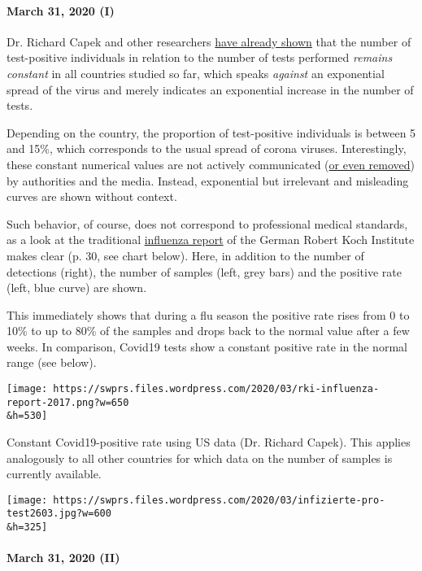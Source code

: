 \hypertarget{march-31-2020-i}{%
\paragraph{March 31, 2020 (I)}\label{march-31-2020-i}}

Dr. Richard Capek and other researchers
\href{https://coronadaten.wordpress.com/}{have already shown} that the
number of test-positive individuals in relation to the number of tests
performed \emph{remains constant} in all countries studied so far, which
speaks \emph{against} an exponential spread of the virus and merely
indicates an exponential increase in the number of tests.

Depending on the country, the proportion of test-positive individuals is
between 5 and 15\%, which corresponds to the usual spread of corona
viruses. Interestingly, these constant numerical values are not actively
communicated
(\href{https://multipolar-magazin.de/artikel/coronavirus-irrefuhrung-fallzahlen}{or
even removed}) by authorities and the media. Instead, exponential but
irrelevant and misleading curves are shown without context.

Such behavior, of course, does not correspond to professional medical
standards, as a look at the traditional
\href{https://influenza.rki.de/Saisonberichte/2017.pdf}{influenza
report} of the German Robert Koch Institute makes clear (p. 30, see
chart below). Here, in addition to the number of detections (right), the
number of samples (left, grey bars) and the positive rate (left, blue
curve) are shown.

This immediately shows that during a flu season the positive rate rises
from 0 to 10\% to up to 80\% of the samples and drops back to the normal
value after a few weeks. In comparison, Covid19 tests show a constant
positive rate in the normal range (see below).

\texttt{[image: https://swprs.files.wordpress.com/2020/03/rki-influenza-report-2017.png?w=650\\\&h=530]}

Constant Covid19-positive rate using US data (Dr. Richard Capek). This
applies analogously to all other countries for which data on the number
of samples is currently available.

\texttt{[image: https://swprs.files.wordpress.com/2020/03/infizierte-pro-test2603.jpg?w=600\\\&h=325]}

\hypertarget{march-31-2020-ii}{%
\paragraph{March 31, 2020 (II)}\label{march-31-2020-ii}}

